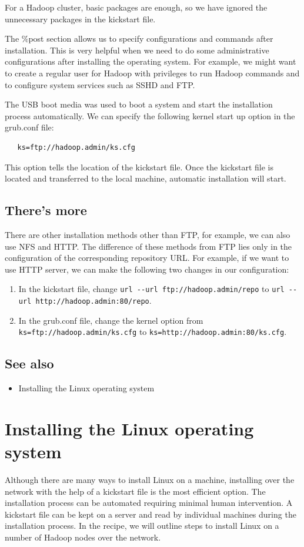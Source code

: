 For a Hadoop cluster, basic packages are enough, so we have ignored the unnecessary packages in the kickstart file.

The \%post section allows us to specify configurations and commands after installation. This is very helpful when we need to do some administrative configurations after installing the operating system. For example, we might want to create a regular user for Hadoop with privileges to run Hadoop commands and to configure system services such as SSHD and FTP.

The USB boot media was used to boot a system and start the installation process automatically. We can specify the following kernel start up option in the grub.conf file:
\begin{verbatim}
   ks=ftp://hadoop.admin/ks.cfg
\end{verbatim}
This option tells the location of the kickstart file. Once the kickstart file is located and transferred to the local machine, automatic installation will start.
\subsection*{There's more}
There are other installation methods other than FTP, for example, we can also use NFS and HTTP. The difference of these methods from FTP lies only in the configuration of the corresponding repository URL. For example, if we want to use HTTP server, we can make the following two changes in our configuration:
\begin{enumerate}
  \item In the kickstart file, change \verb|url --url ftp://hadoop.admin/repo| to \verb|url --url http://hadoop.admin:80/repo|.
  \item In the grub.conf file, change the kernel option from \verb|ks=ftp://hadoop.admin/ks.cfg| to \verb|ks=http://hadoop.admin:80/ks.cfg|.
\end{enumerate}
\subsection*{See also}
\begin{itemize}
  \item Installing the Linux operating system
\end{itemize}
\section{Installing the Linux operating system}
Although there are many ways to install Linux on a machine, installing over the network with the help of a kickstart file is the most efficient option. The installation process can be automated requiring minimal human intervention. A kickstart file can be kept on a server and read by individual machines during the installation process. In the recipe, we will outline steps to install Linux on a number of Hadoop nodes over the network.

